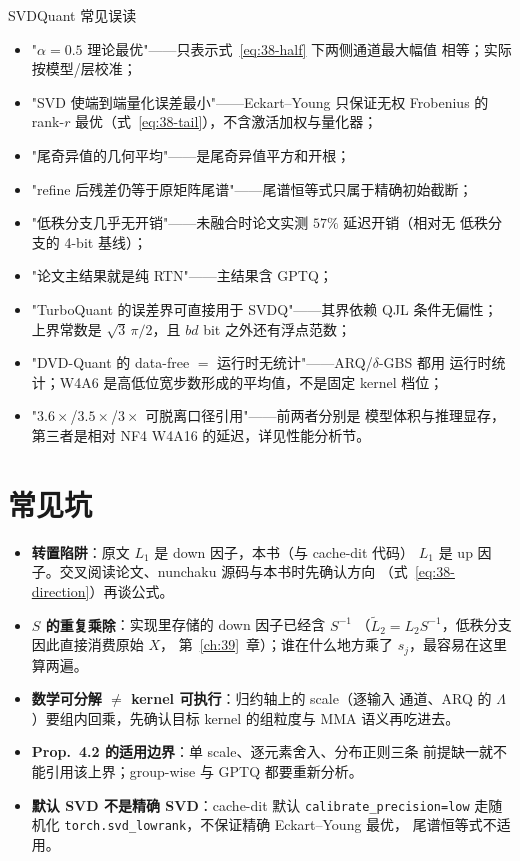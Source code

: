 \begin{kaogu}[F3]{SVDQuant 常见误读}
\begin{itemize}[itemsep=0.5pt,topsep=1pt]
  \item "$\alpha=0.5$ 理论最优"——只表示式~\ref{eq:38-half} 下两侧通道最大幅值
        相等；实际按模型/层校准；
  \item "SVD 使端到端量化误差最小"——Eckart--Young 只保证无权 Frobenius 的
        rank-$r$ 最优（式~\ref{eq:38-tail}），不含激活加权与量化器；
  \item "尾奇异值的几何平均"——是尾奇异值平方和开根；
  \item "refine 后残差仍等于原矩阵尾谱"——尾谱恒等式只属于精确初始截断；
  \item "低秩分支几乎无开销"——未融合时论文实测 $57\%$ 延迟开销（相对无
        低秩分支的 4-bit 基线）；
  \item "论文主结果就是纯 RTN"——主结果含 GPTQ；
  \item "TurboQuant 的误差界可直接用于 SVDQ"——其界依赖 QJL 条件无偏性；
        上界常数是 $\sqrt3\,\pi/2$，且 $bd$ bit 之外还有浮点范数；
  \item "DVD-Quant 的 data-free $=$ 运行时无统计"——ARQ/$\delta$-GBS 都用
        运行时统计；W4A6 是高低位宽步数形成的平均值，不是固定 kernel 档位；
  \item "$3.6\times$/$3.5\times$/$3\times$ 可脱离口径引用"——前两者分别是
        模型体积与推理显存，第三者是相对 NF4 W4A16 的延迟，详见性能分析节。
\end{itemize}
\end{kaogu}

\section{常见坑}

\begin{itemize}[itemsep=1pt,topsep=2pt]
  \item \textbf{转置陷阱}：原文 $L_1$ 是 down 因子，本书（与 cache-dit 代码）
        $L_1$ 是 up 因子。交叉阅读论文、nunchaku 源码与本书时先确认方向
        （式~\ref{eq:38-direction}）再谈公式。
  \item \textbf{$S$ 的重复乘除}：实现里存储的 down 因子已经含 $S^{-1}$
        （$\widetilde L_2=L_2S^{-1}$，低秩分支因此直接消费原始 $X$，
        第~\ref{ch:39}~章）；谁在什么地方乘了 $s_j$，最容易在这里算两遍。
  \item \textbf{数学可分解 $\ne$ kernel 可执行}：归约轴上的 scale（逐输入
        通道、ARQ 的 $\Lambda$）要组内回乘，先确认目标 kernel 的组粒度与
        MMA 语义再吃进去。
  \item \textbf{Prop.~4.2 的适用边界}：单 scale、逐元素舍入、分布正则三条
        前提缺一就不能引用该上界；group-wise 与 GPTQ 都要重新分析。
  \item \textbf{默认 SVD 不是精确 SVD}：cache-dit 默认 \texttt{calibrate\_precision=low}
        走随机化 \texttt{torch.svd\_lowrank}，不保证精确 Eckart--Young 最优，
        尾谱恒等式不适用。
\end{itemize}


